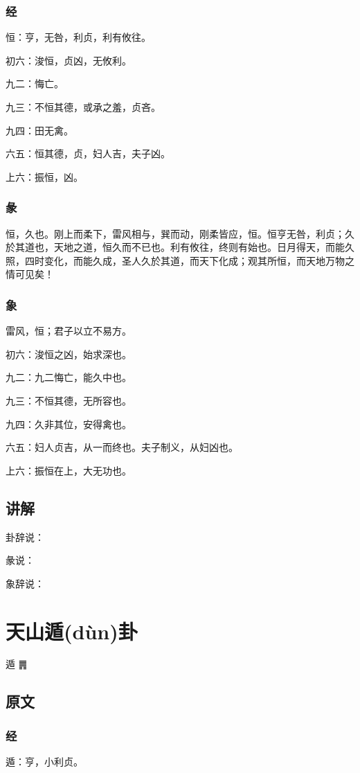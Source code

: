 \documentclass[12pt,oneside]{book}
\begin{document}
\subsection{经}
恒：亨，无咎，利贞，利有攸往。

初六：浚恒，贞凶，无攸利。

九二：悔亡。

九三：不恒其德，或承之羞，贞吝。

九四：田无禽。

六五：恒其德，贞，妇人吉，夫子凶。

上六：振恒，凶。

\subsection{彖}
恒，久也。刚上而柔下，雷风相与，巽而动，刚柔皆应，恒。恒亨无咎，利贞；久於其道也，天地之道，恒久而不已也。利有攸往，终则有始也。日月得天，而能久照，四时变化，而能久成，圣人久於其道，而天下化成；观其所恒，而天地万物之情可见矣！

\subsection{象}
雷风，恒；君子以立不易方。

初六：浚恒之凶，始求深也。

九二：九二悔亡，能久中也。

九三：不恒其德，无所容也。

九四：久非其位，安得禽也。

六五：妇人贞吉，从一而终也。夫子制义，从妇凶也。

上六：振恒在上，大无功也。

\section{讲解}
卦辞说：

彖说：

象辞说：

\chapter{天山遁(dùn)卦}
遁 {\Large ䷠}

\section{原文}

\subsection{经}
遁：亨，小利贞。
\end{document}
